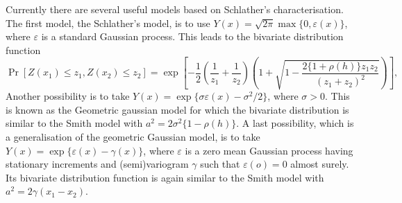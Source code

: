 \documentclass{article}
\begin{document}
Currently there are several useful models based on Schlather's
characterisation. The first model, the Schlather's model, is to use
$Y(x) = \sqrt{2 \pi} \max \{0, \varepsilon(x)\}$, where $\varepsilon$
is a standard Gaussian process. This leads to the bivariate
distribution function
\begin{equation}
\label{eq:schlatherCDF}
\Pr[Z(x_1) \leq z_1, Z(x_2) \leq z_2] = \exp\left[-\frac{1}{2}
\left(\frac{1}{z_1} + \frac{1}{z_2} \right) \left(1 + \sqrt{1 -
\frac{2 \{1 + \rho(h) \} z_1 z_2}{(z_1 +z_2)^2}} \right)
\right],
\end{equation}
Another possibility is to take $Y(x) = \exp\{ \sigma \varepsilon(x) -
\sigma^2 / 2\}$, where $\sigma > 0$. This is known as the Geometric
gaussian model for which the bivariate distribution is similar to the
Smith model with $a^2 = 2 \sigma^2 \{1 - \rho(h)\}$. A last
possibility, which is a generalisation of the geometric Gaussian
model, is to take $Y(x) = \exp\{\varepsilon(x) - \gamma(x)\}$, where
$\varepsilon$ is a zero mean Gaussian process having stationary
increments and (semi)variogram $\gamma$ such that $\varepsilon(o) = 0$
almost surely. Its bivariate distribution function is again similar to
the Smith model with $a^2 = 2 \gamma(x_1 - x_2)$.
\end{document}
